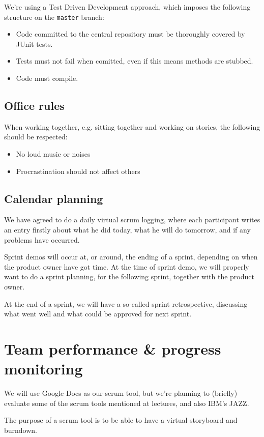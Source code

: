 \documentclass[a4paper,11pt]{article}
\begin{document}
We're using a Test Driven Development approach, which imposes the following structure on the \texttt{master} branch:
\begin{itemize}
\item Code committed to the central repository must be thoroughly covered by JUnit tests.
\item Tests must not fail when comitted, even if this means methods are stubbed.
\item Code must compile.
\end{itemize}


\subsection{Office rules} %
\label{subsec:office_rules}
When working together, e.g. sitting together and working on stories, the following should be respected:

\begin{itemize}
	\item No loud music or noises

	\item Procrastination should not affect others
\end{itemize}

\subsection{Calendar planning} %
\label{subsec:calendar_planning}

We have agreed to do a daily virtual scrum logging, where each participant writes an entry firstly about what he did today, what he will do tomorrow, and if any problems have occurred.

Sprint demos will occur at, or around, the ending of a sprint, depending on when the product owner have got time.
At the time of sprint demo, we will properly want to do a sprint planning, for the following sprint, together with the product owner.

At the end of a sprint, we will have a so-called sprint retrospective, discussing what went well and what could be approved for next sprint.



\section{Team performance \& progress monitoring} %
\label{sec:team_performance_progress_monitoring}
We will use Google Docs as our scrum tool, but we're planning to (briefly) evaluate some of the scrum tools mentioned at lectures, and also IBM's JAZZ.

The purpose of a scrum tool is to be able to have a virtual storyboard and burndown.
\end{document}
